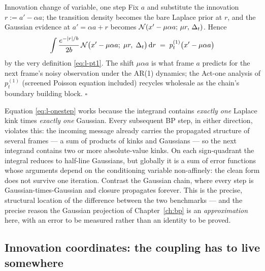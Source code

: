 \begin{toolbox}{Innovation change of variable, one step}
Fix $a$ and substitute the innovation $r := a' - \alpha a$; the transition
density becomes the bare Laplace prior at $r$, and the Gaussian evidence at
$a' = \alpha a + r$ becomes $\mathcal{N}(x' - \mu\alpha a;\, \mu r,\, \Delta_t)$.
Hence
\begin{equation*}
  \int \frac{e^{-|r|/b}}{2b}\,
  \mathcal{N}\big( x' - \mu\alpha a;\; \mu r,\; \Delta_t \big)\, \mathrm{d} r
  \;=\; p_t^{(1)}\big( x' - \mu\alpha a \big)
\end{equation*}
by the very definition \eqref{eq:l-pt1}. The shift $\mu\alpha a$ is what
frame $a$ predicts for the next frame's noisy observation under the AR(1)
dynamics; the Act-one analysis of $p_t^{(1)}$ (screened Poisson equation
included) recycles wholesale as the chain's boundary building block.
\hfill$\square$
\end{toolbox}

\begin{remark}\label{rmk:l-breakdown}
Equation \eqref{eq:l-onestep} works because the integrand contains
\emph{exactly one} Laplace kink times \emph{exactly one} Gaussian. Every
subsequent BP step, in either direction, violates this: the incoming
message already carries the propagated structure of several frames --- a
sum of products of kinks and Gaussians --- so the next integrand contains
two or more absolute-value kinks. On each sign-quadrant the integral
reduces to half-line Gaussians, but globally it is a sum of error functions
whose arguments depend on the conditioning variable non-affinely: the clean
form does not survive one iteration. Contrast the Gaussian chain, where
every step is Gaussian-times-Gaussian and closure propagates forever. This
is the precise, structural location of the difference between the two
benchmarks --- and the precise reason the Gaussian projection of
Chapter~\ref{ch:bp} is an \emph{approximation} here, with an error to be
measured rather than an identity to be proved.
\end{remark}

\subsection{Innovation coordinates: the coupling has to live somewhere}

